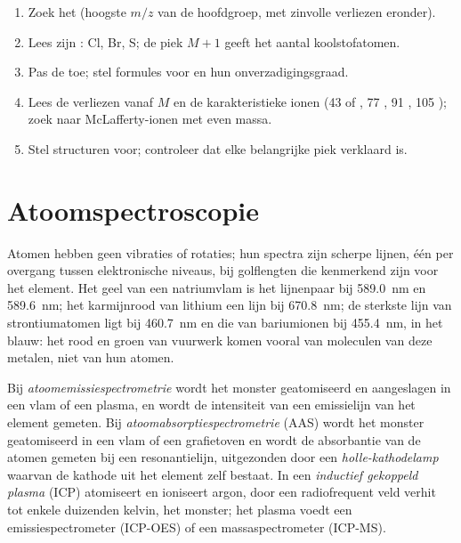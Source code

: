 \begin{method}\label{met:b2:mass-spec-atomic:read-ms}
\begin{enumerate}
  \item Zoek het  (hoogste $m/z$ van de hoofdgroep, met zinvolle verliezen eronder).
  \item Lees zijn : Cl, Br, S; de piek $M+1$ geeft het aantal koolstofatomen.
  \item Pas de  toe; stel formules voor en hun onverzadigingsgraad.
  \item Lees de verliezen vanaf $M$ en de karakteristieke ionen (43  of , 77
        , 91 , 105 ); zoek naar McLafferty-ionen met even massa.
  \item Stel structuren voor; controleer dat elke belangrijke piek verklaard is.
\end{enumerate}
\end{method}

\section{Atoomspectroscopie}

Atomen hebben geen vibraties of rotaties; hun spectra zijn scherpe lijnen, één per overgang tussen
elektronische niveaus, bij golflengten die kenmerkend zijn voor het element. Het geel van een natriumvlam is het
lijnenpaar bij \qty{589.0}{nm} en \qty{589.6}{nm}; het karmijnrood van lithium een lijn bij \qty{670.8}{nm};
de sterkste lijn van strontiumatomen ligt bij \qty{460.7}{nm} en die van bariumionen bij
\qty{455.4}{nm}, in het blauw: het rood en groen van vuurwerk komen vooral van moleculen van deze
metalen, niet van hun atomen.

\begin{definition}[Atoomspectrometrie]\label{def:b2:mass-spec-atomic:atomic}
Bij \emph{atoomemissiespectrometrie} wordt het monster geatomiseerd en
aangeslagen in een vlam of een plasma, en wordt de intensiteit van een emissielijn van het element gemeten. Bij
\emph{atoomabsorptiespectrometrie} (AAS) wordt het monster
geatomiseerd in een vlam of een grafietoven en wordt de absorbantie van de atomen gemeten bij een
resonantielijn, uitgezonden door een \emph{holle-kathodelamp} waarvan de kathode uit het
element zelf bestaat. In een \emph{inductief gekoppeld plasma} (ICP) atomiseert en ioniseert argon,
door een radiofrequent veld verhit tot enkele duizenden kelvin, het monster; het
plasma voedt een emissiespectrometer (ICP-OES) of een massaspectrometer (ICP-MS).
\end{definition}

